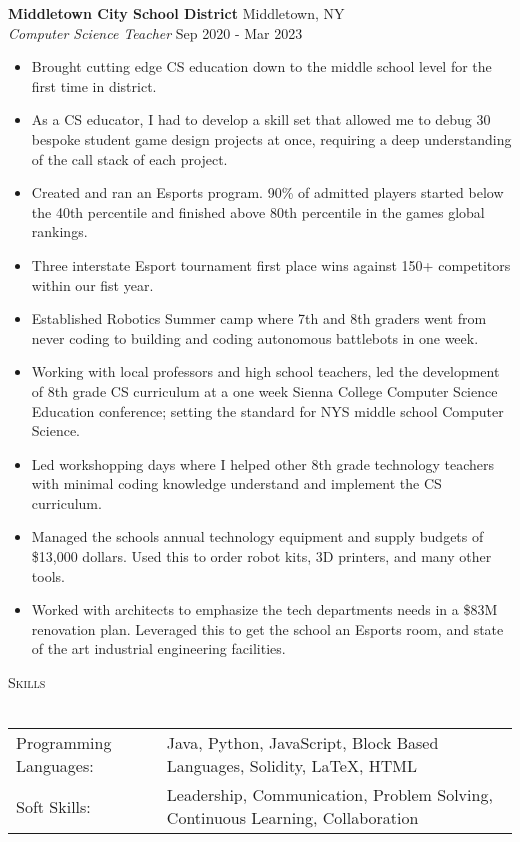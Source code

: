 \documentclass[a4paper]{article}
\newcommand{\lineunder} {
    \vspace*{-8pt} \\
    \hspace*{-18pt} \hrulefill \\
}
\newcommand{\header} [1] {
    {\hspace*{-18pt}\vspace*{6pt} \textsc{#1}}
    \vspace*{-6pt} \lineunder
}
\begin{document}
\textbf{Middletown City School District} \hfill Middletown, NY\\
\textit{Computer Science Teacher} \hfill Sep 2020 - Mar 2023\\
\vspace{-1mm}
\begin{itemize} \itemsep 1pt
	\item Brought cutting edge CS education down to the middle school level for the first time in district.
    \item As a CS educator, I had to develop a skill set that allowed me to debug 30 bespoke student game design projects at once, requiring a deep understanding of the call stack of each project.
	\item Created and ran an Esports program. 90\% of admitted players started below the 40th percentile and finished above 80th percentile in the games\textquotesingle{} global rankings.
	\item Three interstate Esport tournament first place wins against 150+ competitors within our fist year.
	\item Established Robotics Summer camp where 7th and 8th graders went from never coding to building and coding autonomous battlebots in one week.
	\item Working with local professors and high school teachers, led the development of 8th grade CS curriculum at a one week Sienna College Computer Science Education conference; setting the standard for NYS middle school Computer Science.
	\item Led workshopping days where I helped other 8th grade technology teachers with minimal coding knowledge understand and implement the CS curriculum.
	\item Managed the schools annual technology equipment and supply budgets of \$13,000 dollars. Used this to order robot kits, 3D printers, and many other tools.
	\item Worked with architects to emphasize the tech departments needs in a \$83M renovation plan. Leveraged this to get the school an Esports room, and state of the art industrial engineering facilities.
\end{itemize}

\header{Skills}
\begin{tabular}{ l l }
	Programming Languages: & Java, Python, JavaScript, Block Based Languages, Solidity, LaTeX, HTML        \\
	Soft Skills:           & Leadership, Communication, Problem Solving, Continuous Learning, Collaboration \\
\end{tabular}
\vspace{2mm}
\end{document}
